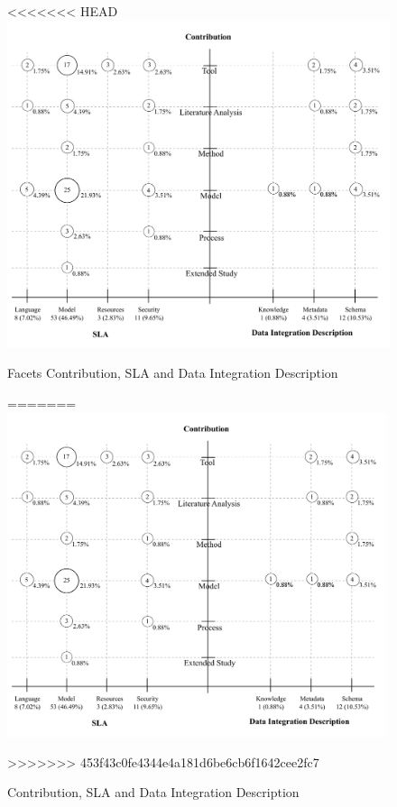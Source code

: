 \begin{figure}[h!]
<<<<<<< HEAD
\centering
\includegraphics[scale=0.45]{figs/bubble-charts/Contribution-SLA-DIdescription.pdf} 
\caption{Facets Contribution, SLA and Data Integration Description}\label{fig:facet1}
=======
\centering 
\includegraphics[width=0.99\textwidth]{figs/bubble-charts/Contribution-SLA-DIdescription.pdf}

\caption{Contribution, SLA and Data Integration Description}\label{fig:facet1}
>>>>>>> 453f43c0fe4344e4a181d6be6cb6f1642cee2fc7
\end{figure}

